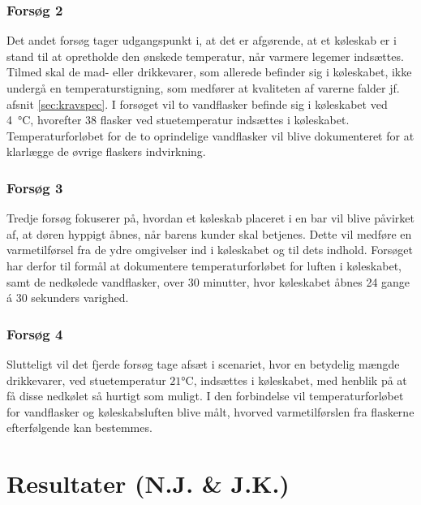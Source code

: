 \documentclass[../Hovedrapport.tex]{subfiles}
\begin{document}
\subsubsection*{Forsøg 2}
Det andet forsøg tager udgangspunkt i, at det er afgørende, at et køleskab er i stand til at opretholde den ønskede temperatur, når varmere legemer indsættes. Tilmed skal de mad- eller drikkevarer, som allerede befinder sig i køleskabet, ikke undergå en temperaturstigning, som medfører at kvaliteten af varerne falder jf. afsnit \ref{sec:kravspec}. I forsøget vil to vandflasker befinde sig i køleskabet ved \SI{4}{\celsius}, hvorefter 38 flasker ved stuetemperatur indsættes i køleskabet. Temperaturforløbet for de to oprindelige vandflasker vil blive dokumenteret for at klarlægge de øvrige flaskers indvirkning. 

\subsubsection*{Forsøg 3}
Tredje forsøg fokuserer på, hvordan et køleskab placeret i en bar vil blive påvirket af, at døren hyppigt åbnes, når barens kunder skal betjenes. Dette vil medføre en varmetilførsel fra de ydre omgivelser ind i køleskabet og til dets indhold. Forsøget har derfor til formål at dokumentere temperaturforløbet for luften i køleskabet, samt de nedkølede vandflasker, over 30 minutter, hvor køleskabet åbnes 24 gange á 30 sekunders varighed. 

\subsubsection*{Forsøg 4}
Slutteligt vil det fjerde forsøg tage afsæt i scenariet, hvor en betydelig mængde drikkevarer, ved stuetemperatur $21\si{\celsius}$, indsættes i køleskabet, med henblik på at få disse nedkølet så hurtigt som muligt. I den forbindelse vil temperaturforløbet for vandflasker og køleskabsluften blive målt, hvorved varmetilførslen fra flaskerne efterfølgende kan bestemmes. 

\section{Resultater (N.J. \& J.K.)}
\end{document}
